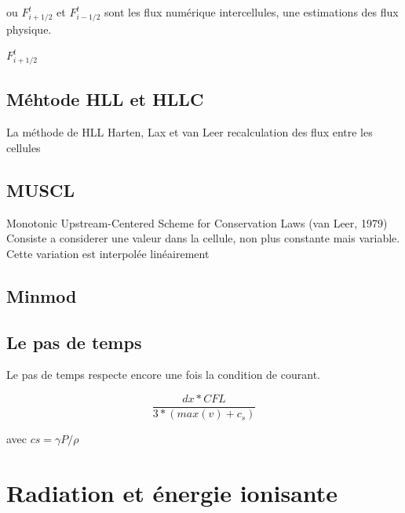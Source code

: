 ou $F^t_{i+1/2}$ et $F^t_{i-1/2}$ sont les flux numérique intercellules, une estimations des flux physique.

$F^t_{i+1/2}$

\subsection{Méhtode HLL et HLLC }
La méthode de HLL Harten, Lax et van Leer 
recalculation des flux entre les cellules

\subsection{MUSCL}
Monotonic Upstream-Centered Scheme for Conservation Laws (van Leer, 1979)
Consiste a considerer une valeur dans la cellule, non plus constante mais variable.
Cette variation est interpolée linéairement

\subsection{Minmod}



\subsection{Le pas de temps}

Le pas de temps respecte encore une fois la condition de courant.

\begin{equation}
\frac{dx * CFL }{3*(max(v) + c_s)}
\end{equation}

avec $cs = \gamma P/\rho$


\clearpage
\section{Radiation et énergie ionisante}
\label{sec:rad_solver}

